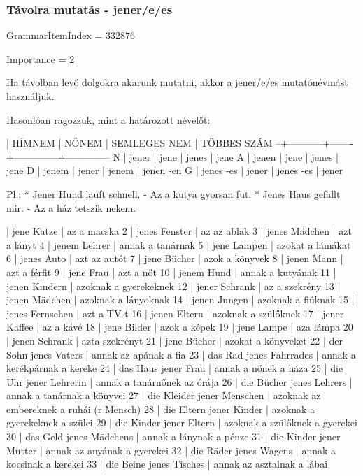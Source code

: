 \documentclass{article}
\newenvironment{desc}{\verbatim}{\endverbatim}
\newenvironment{exmp}{\verbatim}{\endverbatim}
\begin{document}
\subsubsection{Távolra mutatás - jener/e/es}

GrammarItemIndex = 332876

Importance = 2

\begin{desc}
Ha távolban levő dolgokra akarunk mutatni, akkor a jener/e/es mutatónévmást használjuk.

Hasonlóan ragozzuk, mint a határozott névelőt:

  | HÍMNEM    | NŐNEM | SEMLEGES NEM | TÖBBES SZÁM
--+-----------+-------+--------------+--------------
N | jener     | jene  | jenes        | jene
A | jenen     | jene  | jenes        | jene
D | jenem     | jener | jenem        | jenen -en
G | jenes -es | jener | jenes -es    | jener

Pl.: * Jener Hund läuft schnell. - Az a kutya gyorsan fut.
* Jenes Haus gefällt mir. - Az a ház tetszik nekem.
\end{desc}

\begin{exmp}
1 | jene Katze | az a macska
2 | jenes Fenster | az az ablak
3 | jenes Mädchen | azt a lányt
4 | jenem Lehrer | annak a tanárnak
5 | jene Lampen | azokat a lámákat
6 | jenes Auto | azt az autót
7 | jene Bücher | azok a könyvek
8 | jenen Mann | azt a férfit
9 | jene Frau | azt a nőt
10 | jenem Hund | annak a kutyának
11 | jenen Kindern | azoknak a gyerekeknek
12 | jener Schrank | az a szekrény
13 | jenen Mädchen | azoknak a lányoknak
14 | jenen Jungen | azoknak  a fiúknak
15 | jenes Fernsehen | azt a TV-t
16 | jenen Eltern | azoknak a szülőknek
17 | jener Kaffee | az a kávé
18 | jene Bilder | azok a képek
19 | jene Lampe | aza lámpa
20 | jenen Schrank | azta szekrényt
21 | jene Bücher | azokat a könyveket
22 | der Sohn jenes Vaters | annak az apának a fia
23 | das Rad jenes Fahrrades | annak a kerékpárnak a kereke
24 | das Haus jener Frau | annak a nőnek a háza
25 | die Uhr jener Lehrerin | annak a tanárnőnek az órája
26 | die Bücher jenes Lehrers | annak a tanárnak a könyvei
27 | die Kleider jener Menschen | azoknak az embereknek a ruhái (r Mensch)
28 | die Eltern jener Kinder | azoknak a gyerekeknek a szülei
29 | die Kinder jener Eltern | azoknak a szülőknek a gyerekei
30 | das Geld jenes Mädchens | annak a lánynak a pénze
31 | die Kinder jener Mutter | annak az anyának a gyerekei
32 | die Räder jenes Wagens | annak a kocsinak a kerekei
33 | die Beine jenes Tisches | annak az asztalnak a lábai
\end{exmp}
\end{document}
